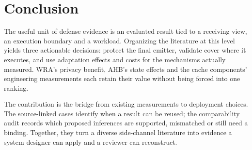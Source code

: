 \section{Conclusion}\label{sec:conclusion}
The useful unit of defense evidence is an evaluated result tied to a receiving view, an execution boundary and a workload. Organizing the literature at this level yields three actionable decisions: protect the final emitter, validate cover where it executes, and use adaptation effects and costs for the mechanisms actually measured. WRA's privacy benefit, AHB's state effects and the cache components' engineering measurements each retain their value without being forced into one ranking.

The contribution is the bridge from existing measurements to deployment choices. The source-linked cases identify when a result can be reused; the comparability audit records which proposed inferences are supported, mismatched or still need a binding. Together, they turn a diverse side-channel literature into evidence a system designer can apply and a reviewer can reconstruct.
